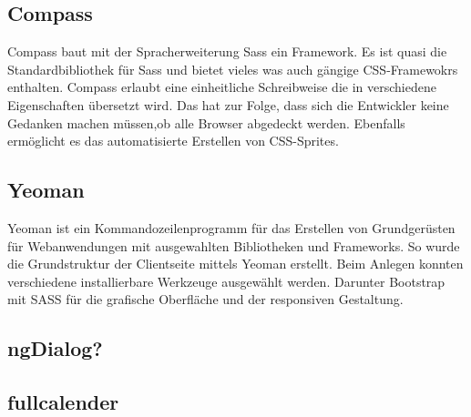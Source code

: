 \subsection{Compass}
Compass baut mit der Spracherweiterung Sass ein Framework. Es ist quasi die Standardbibliothek für Sass und bietet vieles was auch gängige CSS-Framewokrs enthalten. Compass erlaubt eine einheitliche Schreibweise die in verschiedene Eigenschaften übersetzt wird. Das hat zur Folge, dass sich die Entwickler keine Gedanken machen müssen,ob alle Browser abgedeckt werden. Ebenfalls ermöglicht es das automatisierte Erstellen von CSS-Sprites. 

\subsection{Yeoman}
Yeoman ist ein Kommandozeilenprogramm für das Erstellen von Grundgerüsten für Webanwendungen mit ausgewahlten Bibliotheken und Frameworks. So wurde die Grundstruktur der Clientseite mittels Yeoman erstellt. Beim Anlegen konnten verschiedene installierbare Werkzeuge ausgewählt werden. Darunter Bootstrap mit SASS für die grafische Oberfläche und der responsiven Gestaltung.

\subsection{ngDialog?}

\subsection{fullcalender}

